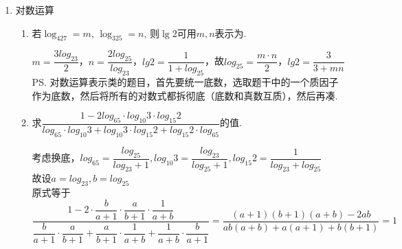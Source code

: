 \begin{enumerate}
\begin{enumerate}
\begin{enumerate}
        \end{enumerate}
        \begin{jieda}
        \end{jieda} 
    \end{enumerate}
    \item 对数运算 
    \begin{enumerate}
        \item 若$\log_427=m$, $\log_325=n$, 则$\lg2$可用$m,n$表示为. 
        \begin{jieda}
            $m = \dfrac{3log_23}{2}$，$n = \dfrac{2log_25}{log_23}$，$lg2 = \dfrac{1}{1+log_25}$，故$log_25 = \dfrac{m\cdot n}{2}$，$lg2 = \dfrac{3}{3+mn}$ \\
            \ps 对数运算表示类的题目，首先要统一底数，选取题干中的一个质因子作为底数，然后将所有的对数式都拆彻底（底数和真数互质），然后再凑.
        \end{jieda}
        \item 求$\dfrac{1-2log_65 \cdot log_{10}3 \cdot log_{15}2}{log_65 \cdot log_{10}3 + log_{10}3 \cdot log_{15}2 + log_{15}2 \cdot log_65}$的值.
        \begin{jieda}
            考虑换底，$log_65 = \dfrac{log_25}{log_23+1}, log_{10}3 = \dfrac{log_23}{log_25+1}, log_{15}2 = \dfrac{1}{log_23 + log_25}$\\
            故设$a = log_23, b = log_25$\\
            原式等于$\dfrac{1 - 2 \cdot \dfrac{b}{a+1} \cdot \dfrac{a}{b+1} \cdot \dfrac{1}{a+b}}{\dfrac{b}{a+1}\cdot \dfrac{a}{b+1} + \dfrac{a}{b+1} \cdot \dfrac{1}{a+b} + \dfrac{1}{a+b} \cdot \dfrac{b}{a+1}} = \dfrac{(a+1)(b+1)(a+b) - 2ab}{ab(a+b) + a(a+1) + b(b+1)} = 1$
        \end{jieda}

\end{enumerate}
\end{enumerate}
